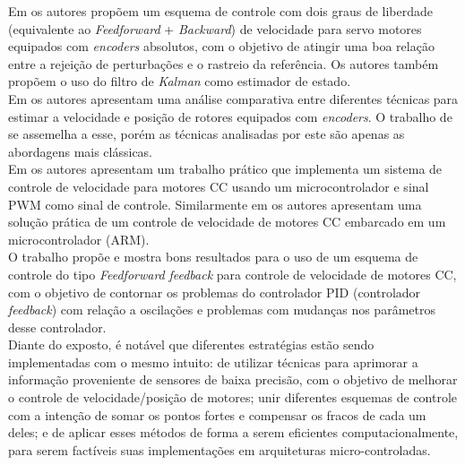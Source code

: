Em \cite{TOF:PIControl} os autores propõem um esquema de controle com dois graus de liberdade (equivalente ao \emph{Feedforward} + \emph{Backward}) de velocidade para servo motores equipados com \emph{encoders} absolutos, com o objetivo de atingir uma boa relação entre a rejeição de perturbações e o rastreio da referência. Os autores também propõem o uso do filtro de \emph{Kalman} como estimador de estado.\\

Em \cite{analise_incr_enc} os autores apresentam uma análise comparativa entre diferentes técnicas para estimar a velocidade e posição de rotores equipados com \emph{encoders}. O trabalho de \cite{quantization_error01} se assemelha a esse, porém as técnicas analisadas por este são apenas as abordagens mais clássicas.\\

Em \cite{pwm_control} os autores apresentam um trabalho prático que implementa um sistema de controle de velocidade para motores CC usando um microcontrolador e sinal PWM como sinal de controle. Similarmente em \cite{embedded_control} os autores apresentam uma solução prática de um controle de velocidade de motores CC embarcado em um microcontrolador (ARM).\\

O trabalho \cite{feedback_feedforward_control01} propõe e mostra bons resultados para o uso de um esquema de controle do tipo \emph{Feedforward} \emph{feedback} para controle de velocidade de motores CC, com o objetivo de contornar os problemas do controlador PID (controlador \emph{feedback}) com relação a oscilações e problemas com mudanças nos parâmetros desse controlador.\\

Diante do exposto, é notável que diferentes estratégias estão sendo implementadas com o mesmo intuito: de utilizar técnicas para aprimorar a informação proveniente de sensores de baixa precisão, com o objetivo de melhorar o controle de velocidade/posição de motores; unir diferentes esquemas de controle com a intenção de somar os pontos fortes e compensar os fracos de cada um deles; e de aplicar esses métodos de forma a serem eficientes computacionalmente, para serem factíveis suas implementações em arquiteturas micro-controladas.

